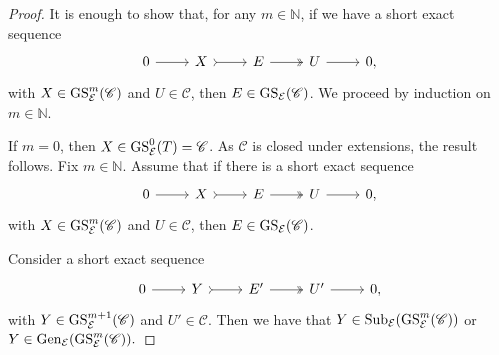\begin{proof}
It is enough to show that, for any $m \in \mathbb{N}$, if we have a short exact sequence \[\begin{tikzcd}
	    0 & X & E  & U &  0,
	\arrow[from=1-1, to=1-2]
	\arrow[tail, from=1-2, to=1-3]
	\arrow[two heads,from=1-3, to=1-4]
	\arrow[from=1-4, to=1-5]
\end{tikzcd} \] with $X\in \operatorname{GS}^m_{\mathcal{E}}(\mathscr{C})$ and $U \in \mathscr{C}$, then $E \in  \operatorname{GS}_{\mathcal{E}}(\mathscr{C})$. We proceed by induction on $m \in \mathbb{N}$. 

If $m=0$, then $X \in \operatorname{GS}^0_{\mathcal{E}}(T) = \mathscr{C}$. As $\mathscr{C}$ is closed under extensions, the result follows. Fix $m \in \mathbb{N}$. Assume that if there is a short exact sequence \[\begin{tikzcd}
	0 & X & E  & U &  0,
	\arrow[from=1-1, to=1-2]
	\arrow[tail, from=1-2, to=1-3]
	\arrow[two heads,from=1-3, to=1-4]
	\arrow[from=1-4, to=1-5]
\end{tikzcd} \] with $X \in \operatorname{GS}^{m}_{\mathcal{E}}(\mathscr{C})$ and $U \in \mathscr{C}$, then $E \in \operatorname{GS}_{\mathcal{E}}(\mathscr{C})$.

Consider a short exact sequence \[\begin{tikzcd}
	0 & Y & E'  & U' &  0,
	\arrow[from=1-1, to=1-2]
	\arrow[tail, from=1-2, to=1-3]
	\arrow[two heads,from=1-3, to=1-4]
	\arrow[from=1-4, to=1-5]
\end{tikzcd} \] with $Y \in \operatorname{GS}^{m+1}_{\mathcal{E}}(\mathscr{C})$ and $U' \in \mathscr{C}$. Then we have that $Y \in \operatorname{Sub}_\mathcal{E}(\operatorname{GS}^{m}_{\mathcal{E}}(\mathscr{C}))$ or $Y \in \operatorname{Gen}_\mathcal{E}(\operatorname{GS}^{m}_{\mathcal{E}}(\mathscr{C})).$


\end{proof}

